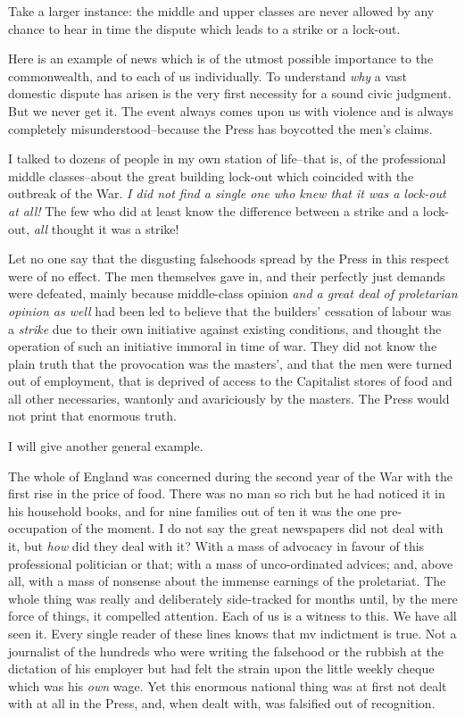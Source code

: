 \documentclass{book}
\begin{document}
Take a larger instance: the middle and upper classes are never allowed by any chance to hear in time the dispute which leads to a strike or a lock-out.

Here is an example of news which is of the utmost possible importance to the commonwealth, and to each of us individually. To understand \emph{why} a vast domestic dispute has arisen is the very first necessity for a sound civic judgment. But we never get it. The event always comes upon us with violence and is always completely misunderstood–because the Press has boycotted the men’s claims.

I talked to dozens of people in my own station of life–that is, of the professional middle classes–about the great building lock-out which coincided with the outbreak of the War. \emph{I did not find a single one who knew that it was a lock-out at all!} The few who did at least know the difference between a strike and a lock-out, \emph{all} thought it was a strike!

Let no one say that the disgusting falsehoods spread by the Press in this respect were of no effect. The men themselves gave in, and their perfectly just demands were defeated, mainly because middle-class opinion \emph{and a great deal of proletarian opinion as well} had been led to believe that the builders’ cessation of labour was a \emph{strike} due to their own initiative against existing conditions, and thought the operation of such an initiative immoral in time of war. They did not know the plain truth that the provocation was the masters’, and that the men were turned out of employment, that is deprived of access to the Capitalist stores of food and all other necessaries, wantonly and avariciously by the masters. The Press would not print that enormous truth.

I will give another general example.

The whole of England was concerned during the second year of the War with the first rise in the price of food. There was no man so rich but he had noticed it in his household books, and for nine families out of ten it was the one pre-occupation of the moment. I do not say the great newspapers did not deal with it, but \emph{how} did they deal with it? With a mass of advocacy in favour of this professional politician or that; with a mass of unco-ordinated advices; and, above all, with a mass of nonsense about the immense earnings of the proletariat. The whole thing was really and deliberately side-tracked for months until, by the mere force of things, it compelled attention. Each of us is a witness to this. We have all seen it. Every single reader of these lines knows that mv indictment is true. Not a journalist of the hundreds who were writing the falsehood or the rubbish at the dictation of his employer but had felt the strain upon the little weekly cheque which was his \emph{own} wage. Yet this enormous national thing was at first not dealt with at all in the Press, and, when dealt with, was falsified out of recognition.
\end{document}

